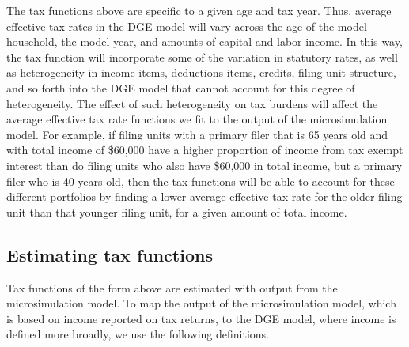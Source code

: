 \documentclass[letterpaper,12pt]{article}
\theoremstyle{definition}
\begin{document}
\begin{spacing}{1.5}
%

The tax functions above are specific to a given age and tax year.  Thus, average effective tax rates in the DGE model will vary across the age of the model household, the model year, and amounts of capital and labor income.  In this way, the tax function will incorporate some of the variation in statutory rates, as well as heterogeneity in income items, deductions items, credits, filing unit structure, and so forth into the DGE model that cannot account for this degree of heterogeneity.  The effect of such heterogeneity on tax burdens will affect the average effective tax rate functions we fit to the output of the microsimulation model.  For example, if filing units with a primary filer that is 65 years old and with total income of \$60,000 have a higher proportion of income from tax exempt interest than do filing units who also have \$60,000 in total income, but a primary filer who is 40 years old, then the tax functions will be able to account for these different portfolios by finding a lower average effective tax rate for the older filing unit than that younger filing unit, for a given amount of total income.

 \subsection{Estimating tax functions}\label{SecEstTaxFunc}
 
 Tax functions of the form above are estimated with output from the microsimulation model.  To map the output of the microsimulation model, which is based on income reported on tax returns, to the DGE model, where income is defined more broadly, we use the following definitions.
 

\end{spacing}
\end{document}
